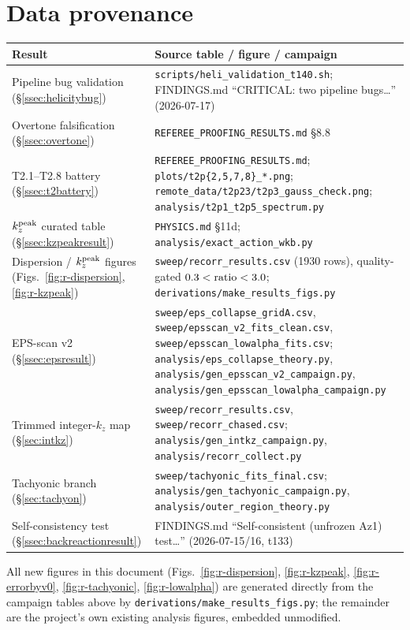 \documentclass[11pt,a4paper]{article}
\numberwithin{equation}{section}
\theoremstyle{remark}
\newcommand{\kz}{k_z}
\begin{document}
\clearpage
\appendix
\section{Data provenance}
\label{app:provenance}

\begin{center}
\begin{tabular}{p{}p{}}
\toprule
Result & Source table / figure / campaign\\
\midrule
Pipeline bug validation (\S\ref{ssec:helicitybug}) &
\texttt{scripts/heli\_validation\_t140.sh}; FINDINGS.md
``CRITICAL: two pipeline bugs\ldots'' (2026-07-17)\\
Overtone falsification (\S\ref{ssec:overtone}) &
\texttt{REFEREE\_PROOFING\_RESULTS.md} \S8.8\\
T2.1--T2.8 battery (\S\ref{ssec:t2battery}) &
\texttt{REFEREE\_PROOFING\_RESULTS.md}; \texttt{plots/t2p\{2,5,7,8\}\_*.png};
\texttt{remote\_data/t2p23/t2p3\_gauss\_check.png};
\texttt{analysis/t2p1\_t2p5\_spectrum.py}\\
$\kz^{\rm peak}$ curated table (\S\ref{ssec:kzpeakresult}) &
\texttt{PHYSICS.md} \S11d; \texttt{analysis/exact\_action\_wkb.py}\\
Dispersion / $\kz^{\rm peak}$ figures (Figs.~\ref{fig:r-dispersion},
\ref{fig:r-kzpeak}) &
\texttt{sweep/recorr\_results.csv} (1930 rows), quality-gated
$0.3<{\rm ratio}<3.0$; \texttt{derivations/make\_results\_figs.py}\\
EPS-scan v2 (\S\ref{ssec:epsresult}) &
\texttt{sweep/eps\_collapse\_gridA.csv},
\texttt{sweep/epsscan\_v2\_fits\_clean.csv},
\texttt{sweep/epsscan\_lowalpha\_fits.csv};
\texttt{analysis/eps\_collapse\_theory.py},
\texttt{analysis/gen\_epsscan\_v2\_campaign.py},
\texttt{analysis/gen\_epsscan\_lowalpha\_campaign.py}\\
Trimmed integer-$\kz$ map (\S\ref{sec:intkz}) &
\texttt{sweep/recorr\_results.csv}, \texttt{sweep/recorr\_chased.csv};
\texttt{analysis/gen\_intkz\_campaign.py}, \texttt{analysis/recorr\_collect.py}\\
Tachyonic branch (\S\ref{sec:tachyon}) &
\texttt{sweep/tachyonic\_fits\_final.csv};
\texttt{analysis/gen\_tachyonic\_campaign.py},
\texttt{analysis/outer\_region\_theory.py}\\
Self-consistency test (\S\ref{ssec:backreactionresult}) &
FINDINGS.md ``Self-consistent (unfrozen Az1) test\ldots'' (2026-07-15/16, t133)\\
\bottomrule
\end{tabular}
\end{center}

All new figures in this document (Figs.~\ref{fig:r-dispersion},
\ref{fig:r-kzpeak}, \ref{fig:r-errorbyv0}, \ref{fig:r-tachyonic},
\ref{fig:r-lowalpha}) are generated directly from the campaign tables
above by \texttt{derivations/make\_results\_figs.py}; the remainder are
the project's own existing analysis figures, embedded unmodified.
\end{document}
